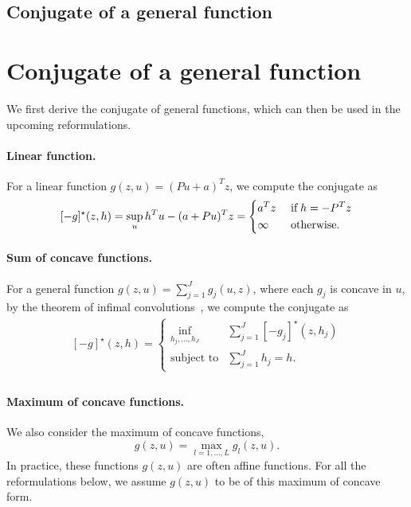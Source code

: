 \ifpreprint
\subsection{Conjugate of a general function}
\else 
\section{Conjugate of a general function}
\fi 
We first derive the conjugate of general functions, which can then be used in the upcoming reformulations.
\paragraph{Linear function.}
For a linear function $g(z,u) = (Pu + a)^Tz$, we compute the conjugate as
\begin{equation*}
	\label{eq:conj_affine}
	[-g]^\star(z,h) =  \sup_u h^Tu - (a + Pu)^Tz =
	\begin{dcases}
            a^Tz  & \text{ if}\; h = -P^Tz \\
		\infty & \text{ otherwise}.
	\end{dcases}
\end{equation*}
\paragraph{Sum of concave functions.}
For a general function $g(z,u) = \sum_{j=1}^J g_j(u,z)$, where each $g_j$ is concave in $u$, by the theorem of infimal convolutions~\cite[Theorem 11.23(a), p. 493]{rockafellar_wets_1998}, we compute the conjugate as
\begin{equation*}
	\begin{aligned}
	\label{eq:conj_gen}
	[-g]^\star(z,h) =  \begin{cases}  \underset{h_j,\dots,h_J}{\inf} & \sum_{j=1}^J [-g_j]^\star(z,h_j) \\
		\mbox{subject to} & \sum_{j=1}^J h_j = h.
	\end{cases}\\
\end{aligned}
	\end{equation*}

\paragraph{Maximum of concave functions.}
We also consider the maximum of concave functions, $$g(z,u) = \max_{l=1,\dots,L} g_l(z,u).$$ In practice, these functions $g(z,u)$ are often affine functions. For all the reformulations below, we assume $g(z,u)$ to be of this maximum of concave form.


